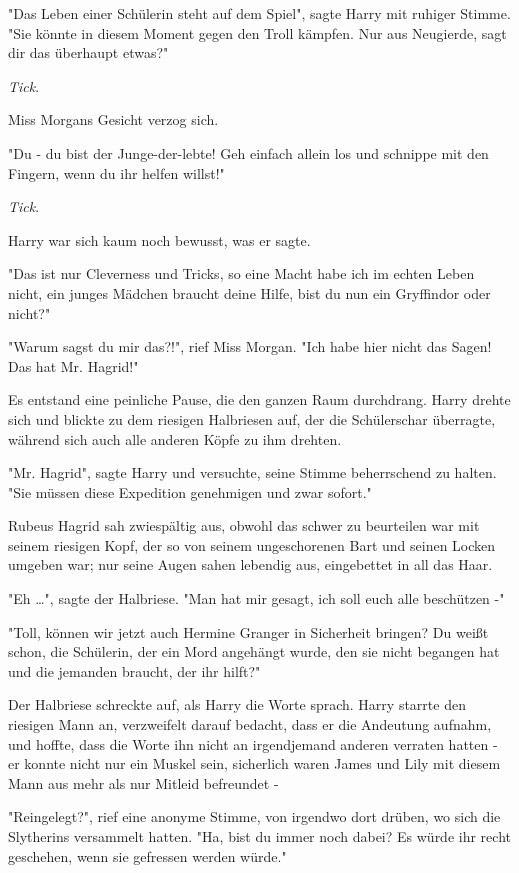 {"Das Leben einer Schülerin steht auf dem Spiel", sagte Harry mit ruhiger Stimme. "Sie könnte in diesem Moment gegen den Troll kämpfen. Nur aus Neugierde, sagt dir das überhaupt etwas?"

\emph{Tick}.

Miss Morgans Gesicht verzog sich.

"Du - du bist der Junge-der-lebte! Geh einfach allein los und schnippe mit den Fingern, wenn du ihr helfen willst!"

\emph{Tick}.

Harry war sich kaum noch bewusst, was er sagte.

"Das ist nur Cleverness und Tricks, so eine Macht habe ich im echten Leben nicht, ein junges Mädchen braucht deine Hilfe, bist du nun ein Gryffindor oder nicht?"

"Warum sagst du mir das?!", rief Miss Morgan. "Ich habe hier nicht das Sagen! Das hat Mr. Hagrid!"

Es entstand eine peinliche Pause, die den ganzen Raum durchdrang. Harry drehte sich und blickte zu dem riesigen Halbriesen auf, der die Schülerschar überragte, während sich auch alle anderen Köpfe zu ihm drehten.

"Mr. Hagrid", sagte Harry und versuchte, seine Stimme beherrschend zu halten. "Sie müssen diese Expedition genehmigen und zwar sofort."

Rubeus Hagrid sah zwiespältig aus, obwohl das schwer zu beurteilen war mit seinem riesigen Kopf, der so von seinem ungeschorenen Bart und seinen Locken umgeben war; nur seine Augen sahen lebendig aus, eingebettet in all das Haar.

"Eh …", sagte der Halbriese. "Man hat mir gesagt, ich soll euch alle beschützen -"

"Toll, können wir jetzt auch Hermine Granger in Sicherheit bringen? Du weißt schon, die Schülerin, der ein Mord angehängt wurde, den sie nicht begangen hat und die jemanden braucht, der ihr hilft?"

Der Halbriese schreckte auf, als Harry die Worte sprach. Harry starrte den riesigen Mann an, verzweifelt darauf bedacht, dass er die Andeutung aufnahm, und hoffte, dass die Worte ihn nicht an irgendjemand anderen verraten hatten - er konnte nicht nur ein Muskel sein, sicherlich waren James und Lily mit diesem Mann aus mehr als nur Mitleid befreundet -

"Reingelegt?", rief eine anonyme Stimme, von irgendwo dort drüben, wo sich die Slytherins versammelt hatten. "Ha, bist du immer noch dabei? Es würde ihr recht geschehen, wenn sie gefressen werden würde."

}
